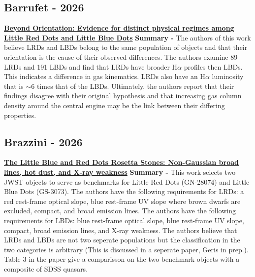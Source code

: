 \documentclass{article}
\begin{document}
\subsection*{Barrufet - 2026}
\href{https://arxiv.org/abs/2608.21522}{\textbf{Beyond Orientation: Evidence for distinct physical regimes among Little Red Dots and Little Blue Dots}}
\newline \textbf{Summary -} The authors of this work believe LRDs and LBDs belong to the same population of objects and that their orientation is the cause of their observed differences. The authors examine 89 LRDs and 191 LBDs and find that LRDs have broader H$\alpha$ profiles then LBDs. This indicates a difference in gas kinematics. LRDs also have an H$\alpha$ luminosity that is $\sim 6$ times that of the LBDs. Ultimately, the authors report that their findings disagree with their original hypothesis and that increasing gas column density around the central engine may be the link between their differing properties.

\subsection*{Brazzini - 2026}
\href{https://ui.adsabs.harvard.edu/abs/2026arXiv260122214B}{\textbf{The Little Blue and Red Dots Rosetta Stones: Non-Gaussian broad lines, hot dust, and X-ray weakness}}
\newline \textbf{Summary -} This work selects two JWST objects to serve as benchmarks for Little Red Dots (GN-28074) and Little Blue Dots (GS-3073). The authors have the following requirements for LRDs: a red rest-frame optical slope, blue rest-frame UV slope where brown dwarfs are excluded, compact, and broad emission lines. The authors have the following requirements for LBDs: blue rest-frame optical slope, blue rest-frame UV slope, compact, broad emission lines, and X-ray weakness. The authors believe that LRDs and LBDs are not two seperate populations but the classification in the two categories is arbitrary (This is discussed in a seperate paper, Geris in prep.). Table 3 in the paper give a comparisson on the two benchmark objects with a composite of SDSS quasars.
\end{document}
